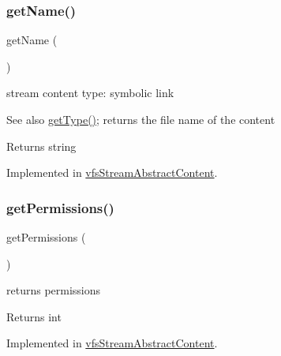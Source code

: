 \subsubsection{\texorpdfstring{get\+Name()}{getName()}}
{\footnotesize\ttfamily get\+Name (\begin{DoxyParamCaption}{ }\end{DoxyParamCaption})}

stream content type\+: symbolic link

\begin{DoxySeeAlso}{See also}
\mbox{\hyperlink{interfaceorg_1_1bovigo_1_1vfs_1_1vfs_stream_content_a830b5c75df72b32396701bc563fbe3c7}{get\+Type()}}; returns the file name of the content
\end{DoxySeeAlso}
\begin{DoxyReturn}{Returns}
string 
\end{DoxyReturn}


Implemented in \mbox{\hyperlink{classorg_1_1bovigo_1_1vfs_1_1vfs_stream_abstract_content_a3d0963e68bb313b163a73f2803c64600}{vfs\+Stream\+Abstract\+Content}}.

\mbox{\label{interfaceorg_1_1bovigo_1_1vfs_1_1vfs_stream_content_a98e8f81c4e0869a6adf4a36ca1a6860a}} 
\subsubsection{\texorpdfstring{get\+Permissions()}{getPermissions()}}
{\footnotesize\ttfamily get\+Permissions (\begin{DoxyParamCaption}{ }\end{DoxyParamCaption})}

returns permissions

\begin{DoxyReturn}{Returns}
int 
\end{DoxyReturn}


Implemented in \mbox{\hyperlink{classorg_1_1bovigo_1_1vfs_1_1vfs_stream_abstract_content_a98e8f81c4e0869a6adf4a36ca1a6860a}{vfs\+Stream\+Abstract\+Content}}.

\mbox{\label{interfaceorg_1_1bovigo_1_1vfs_1_1vfs_stream_content_a830b5c75df72b32396701bc563fbe3c7}} 
